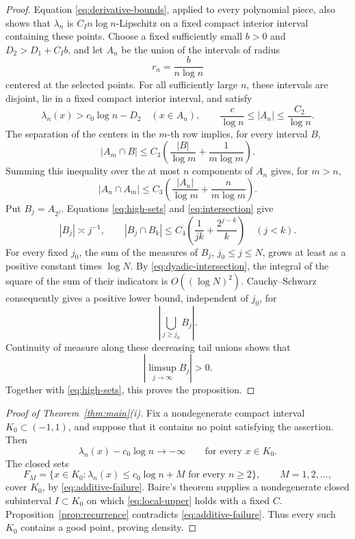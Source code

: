 \documentclass[11pt]{article}
\theoremstyle{remark}
\numberwithin{equation}{section}
\begin{document}
\begin{proof}
Equation \eqref{eq:derivative-bounds}, applied to every polynomial piece, also
shows that \(\lambda_n\) is \(C_In\log n\)-Lipschitz on a fixed compact
interior interval containing these points. Choose a fixed sufficiently small
\(b>0\) and \(D_2>D_1+C_Ib\), and let \(A_n\) be the union of the
intervals of radius
\[
 r_n=\frac{b}{n\log n}
\]
centered at the selected points. For all sufficiently large \(n\), these
intervals are disjoint, lie in a fixed compact interior interval, and satisfy
\begin{equation}\label{eq:high-sets}
 \lambda_n(x)>c_0\log n-D_2\quad(x\in A_n),\qquad
 \frac{c}{\log n}\le |A_n|\le\frac{C_2}{\log n}.
\end{equation}
The separation of the centers in the \(m\)-th row implies, for every interval
\(B\),
\[
 |A_m\cap B|\le C_3\left(\frac{|B|}{\log m}
                              +\frac1{m\log m}\right).
\]
Summing this inequality over the at most \(n\) components of \(A_n\)
gives, for \(m>n\),
\begin{equation}\label{eq:intersection}
 |A_n\cap A_m|
 \le C_3\left(\frac{|A_n|}{\log m}
                              +\frac{n}{m\log m}\right).
\end{equation}
Put \(B_j=A_{2^j}\). Equations \eqref{eq:high-sets} and
\eqref{eq:intersection} give
\begin{equation}\label{eq:dyadic-intersection}
 |B_j|\asymp j^{-1},\qquad
 |B_j\cap B_k|\le C_4\left(\frac1{jk}+\frac{2^{j-k}}k\right)
 \quad(j<k).
\end{equation}
For every fixed \(j_0\), the sum of the measures of \(B_j\), \(j_0\le j\le
N\), grows at least as a positive constant times \(\log N\). By
\eqref{eq:dyadic-intersection}, the integral of the square of the sum of their
indicators is \(O((\log N)^2)\). Cauchy--Schwarz consequently gives a positive
lower bound, independent of \(j_0\), for
\[
 \left|\bigcup_{j\ge j_0}B_j\right|.
\]
Continuity of measure along these decreasing tail unions shows that
\begin{equation}\label{eq:recurrence}
 |\limsup_{j\to\infty}B_j|>0.
\end{equation}
Together with \eqref{eq:high-sets}, this proves the proposition.
\end{proof}

\begin{proof}[Proof of Theorem~\ref{thm:main}(i)]
Fix a nondegenerate compact interval \(K_0\subset(-1,1)\), and suppose
that it contains no point satisfying the assertion. Then
\begin{equation}\label{eq:additive-failure}
 \lambda_n(x)-c_0\log n\longrightarrow-\infty
 \qquad\text{for every }x\in K_0.
\end{equation}
The closed sets
\[
 F_M=\{x\in K_0:\lambda_n(x)\le c_0\log n+M
                   \text{ for every }n\ge2\},
 \qquad M=1,2,\ldots,
\]
cover \(K_0\), by \eqref{eq:additive-failure}. Baire's theorem supplies
a nondegenerate closed subinterval \(I\subset K_0\) on which
\eqref{eq:local-upper} holds with a fixed \(C\).
Proposition~\ref{prop:recurrence} contradicts
\eqref{eq:additive-failure}. Thus every such \(K_0\) contains a good
point, proving density.
\end{proof}
\end{document}
